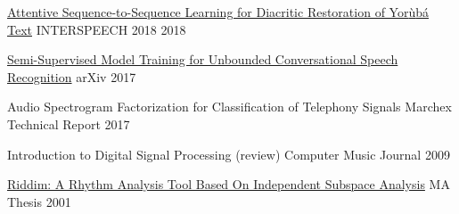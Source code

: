 
\begin{cvhonors}

  \cvhonor
    {\href{https://arxiv.org/abs/1804.00832}{Attentive Sequence-to-Sequence Learning for Diacritic Restoration of Yor{\`u}b{\'a} Text}} %
    {INTERSPEECH 2018} %
    {} %
    {2018} %

  \cvhonor
    {\href{https://arxiv.org/abs/1705.09724}{Semi-Supervised Model Training for Unbounded Conversational Speech Recognition}} %
    {arXiv} %
    {} %
    {2017} %

  \cvhonor
    {Audio Spectrogram Factorization for Classification of Telephony Signals} %
    {Marchex Technical Report} %
    {} %
    {2017} %

  \cvhonor
    {Introduction to Digital Signal Processing (review)} %
    {Computer Music Journal} %
    {} %
    {2009} %
        
  \cvhonor
    {\href{https://arxiv.org/abs/1705.04792}{Riddim: A Rhythm Analysis Tool Based On Independent Subspace Analysis}} %
    {MA Thesis} %
    {} %
    {2001} %
    
\end{cvhonors}
